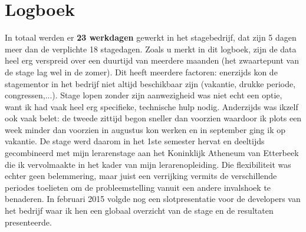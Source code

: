\documentclass[a4paper,11pt]{article}
\theoremstyle{definition}
\begin{document}
\newpage
\section{Logboek}
In totaal werden er \textbf{23 werkdagen} gewerkt in het stagebedrijf, dat zijn 5 dagen meer dan de verplichte 18 stagedagen. Zoals u 
merkt in dit logboek, zijn de data heel erg verspreid over een duurtijd van 
meerdere maanden (het zwaartepunt van de stage lag wel in de zomer). Dit heeft 
meerdere factoren: enerzijds kon de stagementor in het bedrijf niet altijd 
beschikbaar zijn (vakantie, drukke periode, congressen,...). Stage lopen zonder zijn aanwezigheid was niet echt een optie, want ik had 
vaak heel erg specifieke, technische hulp nodig. Anderzijds was ikzelf ook vaak belet: de tweede zittijd begon sneller 
dan voorzien waardoor ik plots een week minder dan voorzien in augustus kon 
werken en in september ging ik op vakantie. De stage werd daarom in het 1ste semester hervat en
deeltijds gecombineerd met mijn lerarenstage aan het Koninklijk Atheneum van Etterbeek
die ik vervolmaakte in het kader van mijn lerarenopleiding. Die flexibiliteit 
was echter geen belemmering, maar juist een verrijking vermits de verschillende 
periodes toelieten om de probleemstelling vanuit een andere invalshoek te 
benaderen. In februari 2015 volgde nog een slotpresentatie voor de developers 
van het bedrijf waar ik hen een globaal overzicht van de stage en de resultaten 
presenteerde.
\end{document}
